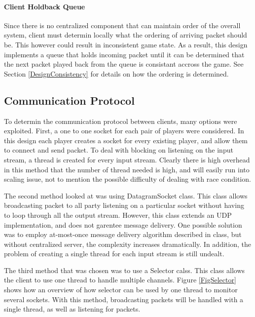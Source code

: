 \paragraph*{Client Holdback Queue}

Since there is no centralized component that can maintain order of the overall system, client must determin locally what the ordering of arriving packet should be. This however could result in inconsistent game state. As a result, this design implements a queue that holds incoming packet until it can be determined that the next packet played back from the queue is consistant accross the game. See Section \ref{DesignConsistency} for details on how the ordering is determined.

\subsection{Communication Protocol}\label{DesignProtocol}

To determin the communication protocol between clients, many options were exploited. First, a one to one socket for each pair of players were considered. In this design each player creates a socket for every existing player, and allow them to connect and send packet. To deal with blocking on listening on the input stream, a thread is created for every input stream. Clearly there is high overhead in this method that the number of thread needed is high, and will easily run into scaling issue, not to mention the possible difficulty of dealing with race condition. 

The second method looked at was using DatagramSocket class. This class allows broadcasting packet to all party listening on a particular socket without having to loop through all the output stream. However, this class extends an UDP implementation, and does not garentee message delivery. One possible solution was to employ at-most-once message delivery algorithm described in class, but without centralized server, the complexity increases dramatically. In addition, the problem of creating a single thread for each input stream is still undealt.

The third method that was chosen was to use a Selector calss. This class allows the client to use one thread to handle multiple channels. Figure \ref{FigSelector} shows how an overview of how selector can be used by one thread to monitor several sockets. With this method, broadcasting packets will be handled with a single thread, as well as listening for packets.

